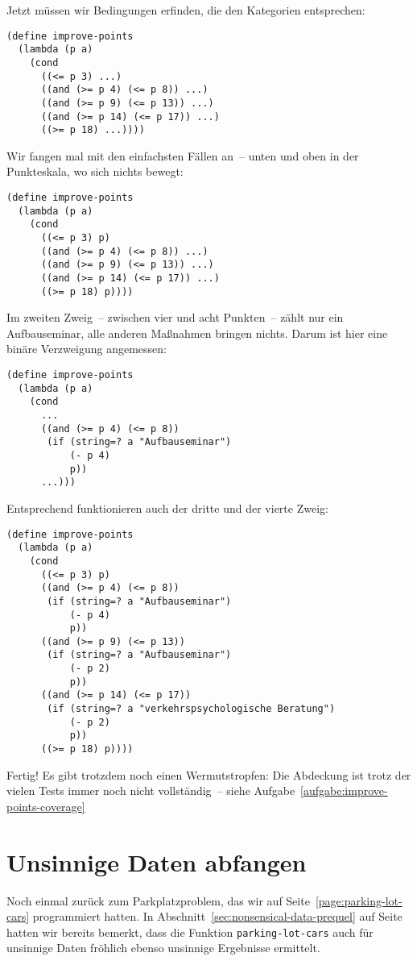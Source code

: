 %
Jetzt müssen wir Bedingungen erfinden, die den Kategorien entsprechen:
%
\begin{verbatim}
(define improve-points
  (lambda (p a)
    (cond
      ((<= p 3) ...)
      ((and (>= p 4) (<= p 8)) ...)
      ((and (>= p 9) (<= p 13)) ...)
      ((and (>= p 14) (<= p 17)) ...)
      ((>= p 18) ...))))
\end{verbatim}
%
Wir fangen mal mit den einfachsten Fällen an~-- unten und oben in der
Punkteskala, wo sich nichts bewegt:
%
\begin{verbatim}
(define improve-points
  (lambda (p a)
    (cond
      ((<= p 3) p)
      ((and (>= p 4) (<= p 8)) ...)
      ((and (>= p 9) (<= p 13)) ...)
      ((and (>= p 14) (<= p 17)) ...)
      ((>= p 18) p))))
\end{verbatim}
%
Im zweiten Zweig~-- zwischen vier und acht Punkten~-- zählt nur ein
Aufbauseminar, alle anderen Maßnahmen bringen nichts.  Darum ist hier
eine binäre Verzweigung angemessen:
%
\begin{verbatim}
(define improve-points
  (lambda (p a)
    (cond
      ...
      ((and (>= p 4) (<= p 8))
       (if (string=? a "Aufbauseminar")
           (- p 4)
           p))
      ...)))
\end{verbatim}
%
Entsprechend funktionieren auch der dritte und der vierte Zweig:
%
\begin{verbatim}
(define improve-points
  (lambda (p a)
    (cond
      ((<= p 3) p)
      ((and (>= p 4) (<= p 8))
       (if (string=? a "Aufbauseminar")
           (- p 4)
           p))
      ((and (>= p 9) (<= p 13))
       (if (string=? a "Aufbauseminar")
           (- p 2)
           p))
      ((and (>= p 14) (<= p 17))
       (if (string=? a "verkehrspsychologische Beratung")
           (- p 2)
           p))
      ((>= p 18) p))))
\end{verbatim}
%
Fertig!  Es gibt trotzdem noch einen Wermutstropfen: Die Abdeckung ist
trotz der vielen Tests immer noch nicht vollständig~-- siehe
Aufgabe~\ref{aufgabe:improve-points-coverage}

\section{Unsinnige Daten abfangen}
\label{sec:nonsensical-data}

Noch einmal zurück zum Parkplatzproblem, das wir auf
Seite~\ref{page:parking-lot-cars} programmiert hatten.  In
Abschnitt~\ref{sec:nonsensical-data-prequel} auf
Seite~\pageref{sec:nonsensical-data-prequel} hatten wir bereits
bemerkt, dass die Funktion
\texttt{parking-lot-cars}
auch für unsinnige Daten fröhlich ebenso unsinnige Ergebnisse
ermittelt.

